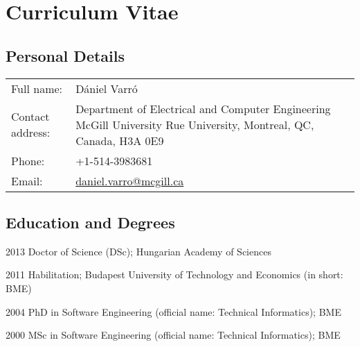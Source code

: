\chapter{Curriculum Vitae}
\label{sec:curriculum-vitae}

\section{Personal Details}

\begin{tabular}{@{}lp{12cm}@{}}
\toprule
Full name:  & Dániel Varró \\ %
Contact address: &  %
Department of Electrical and Computer Engineering \newline
McGill University \newline
3480 Rue University, Montreal, QC, Canada, H3A 0E9\\ %
Phone: &  +1-514-3983681 \\ %
Email: &  \href{mailto:daniel.varro@mcgill.ca}{daniel.varro@mcgill.ca} \\ %
\bottomrule
\end{tabular}

\section{Education and Degrees}

\begin{yearlist}
\item[2013] Doctor of Science (DSc); Hungarian Academy of Sciences  
\item[2011] Habilitation; Budapest University of Technology and Economics (in short: BME) 
\item[2004] PhD in Software Engineering (official name: Technical Informatics); BME
\item[2000] MSc in Software Engineering (official name: Technical Informatics); BME 
\end{yearlist}



